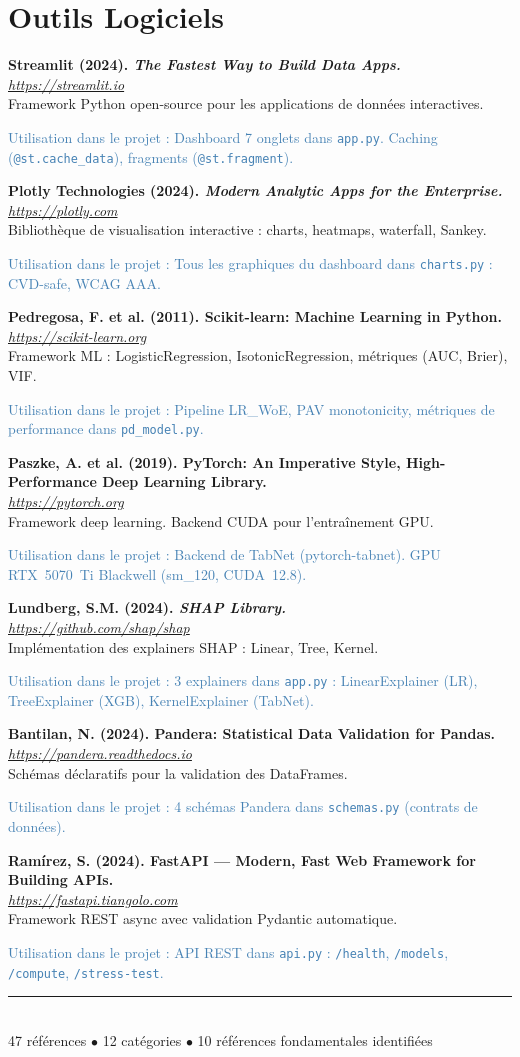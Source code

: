 \documentclass[12pt,a4paper]{article}
\newcommand{\bibentry}[4]{%
  \noindent\textbf{#1}\\
  \textit{#2}\\
  #3\par
  \textcolor{steelblue}{\footnotesize\textsf{Utilisation dans le projet :} #4}\par
  \medskip
}
\begin{document}
\section{Outils Logiciels}

\bibentry{Streamlit (2024). \emph{The Fastest Way to Build Data Apps.}}{\url{https://streamlit.io}}{Framework Python open-source pour les applications de données interactives.}{Dashboard 7 onglets dans \texttt{app.py}. Caching (\texttt{@st.cache\_data}), fragments (\texttt{@st.fragment}).}

\bibentry{Plotly Technologies (2024). \emph{Modern Analytic Apps for the Enterprise.}}{\url{https://plotly.com}}{Bibliothèque de visualisation interactive : charts, heatmaps, waterfall, Sankey.}{Tous les graphiques du dashboard dans \texttt{charts.py} : CVD-safe, WCAG AAA.}

\bibentry{Pedregosa, F. et al. (2011). Scikit-learn: Machine Learning in Python.}{\url{https://scikit-learn.org}}{Framework ML : LogisticRegression, IsotonicRegression, métriques (AUC, Brier), VIF.}{Pipeline LR\_WoE, PAV monotonicity, métriques de performance dans \texttt{pd\_model.py}.}

\bibentry{Paszke, A. et al. (2019). PyTorch: An Imperative Style, High-Performance Deep Learning Library.}{\url{https://pytorch.org}}{Framework deep learning. Backend CUDA pour l'entraînement GPU.}{Backend de TabNet (pytorch-tabnet). GPU RTX~5070~Ti Blackwell (sm\_120, CUDA~12.8).}

\bibentry{Lundberg, S.M. (2024). \emph{SHAP Library.}}{\url{https://github.com/shap/shap}}{Implémentation des explainers SHAP : Linear, Tree, Kernel.}{3 explainers dans \texttt{app.py} : LinearExplainer (LR), TreeExplainer (XGB), KernelExplainer (TabNet).}

\bibentry{Bantilan, N. (2024). Pandera: Statistical Data Validation for Pandas.}{\url{https://pandera.readthedocs.io}}{Schémas déclaratifs pour la validation des DataFrames.}{4 schémas Pandera dans \texttt{schemas.py} (contrats de données).}

\bibentry{Ramírez, S. (2024). FastAPI --- Modern, Fast Web Framework for Building APIs.}{\url{https://fastapi.tiangolo.com}}{Framework REST async avec validation Pydantic automatique.}{API REST dans \texttt{api.py} : \texttt{/health}, \texttt{/models}, \texttt{/compute}, \texttt{/stress-test}.}

\vfill
\begin{center}
\rule{0.4\textwidth}{0.4pt}\\[4pt]
{\small\color{steelblue} 47 références $\bullet$ 12 catégories $\bullet$ 10 références fondamentales identifiées}
\end{center}
\end{document}
